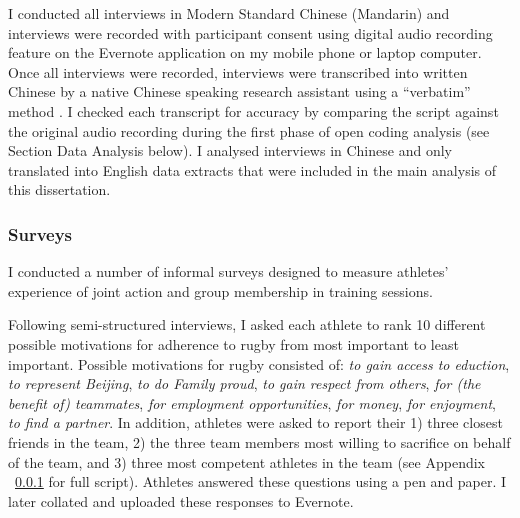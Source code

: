 I conducted all interviews in Modern Standard Chinese (Mandarin) and interviews were recorded with participant consent using digital audio recording feature on the Evernote application on my mobile phone or laptop computer.  Once all interviews were recorded, interviews were transcribed into written Chinese by a native Chinese speaking research assistant using a ``verbatim'' method \citep[i.e., including an account of all verbal and important nonverbal (coughs, pauses, etc) utterances, see][269-70]{Poland2003}.  I checked each transcript for accuracy by comparing the script against the original audio recording during the first phase of open coding analysis (see Section Data Analysis below). I analysed interviews in Chinese and only translated into English data extracts that were included in the main analysis of this dissertation.


\subsubsection{Surveys}

 I conducted a number of informal surveys designed to measure athletes' experience of joint action and group membership in training sessions.

   Following semi-structured interviews, I asked each athlete to rank 10 different possible motivations for adherence to rugby from most important to least important. Possible motivations for rugby consisted of: \textit{to gain access to eduction}, \textit{to represent Beijing}, \textit{to do Family proud}, \textit{to gain respect from others}, \textit{for (the benefit of) teammates}, \textit{for employment opportunities}, \textit{for money}, \textit{for enjoyment}, \textit{to find a partner}. In addition, athletes were asked to report their 1) three closest friends in the team, 2) the three team members most willing to sacrifice on behalf of the team, and 3) three most competent athletes in the team (see Appendix ~\ref{} for full script). Athletes answered these questions using a pen and paper. I later collated and uploaded these responses to Evernote.


